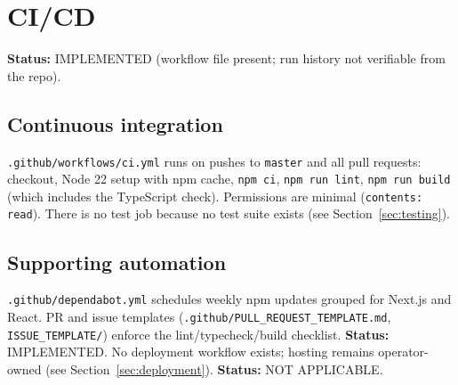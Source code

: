 \section{CI/CD}
\label{sec:cicd}

\textbf{Status:} IMPLEMENTED (workflow file present; run history not verifiable from the repo).

\subsection{Continuous integration}
\texttt{.github/workflows/ci.yml} runs on pushes to \texttt{master} and all pull requests: checkout, Node 22 setup with npm cache, \texttt{npm ci}, \texttt{npm run lint}, \texttt{npm run build} (which includes the TypeScript check). Permissions are minimal (\texttt{contents: read}). There is no test job because no test suite exists (see Section~\ref{sec:testing}).

\subsection{Supporting automation}
\texttt{.github/dependabot.yml} schedules weekly npm updates grouped for Next.js and React. PR and issue templates (\texttt{.github/PULL\_REQUEST\_TEMPLATE.md}, \texttt{ISSUE\_TEMPLATE/}) enforce the lint/typecheck/build checklist. \textbf{Status:} IMPLEMENTED. No deployment workflow exists; hosting remains operator-owned (see Section~\ref{sec:deployment}). \textbf{Status:} NOT APPLICABLE.
